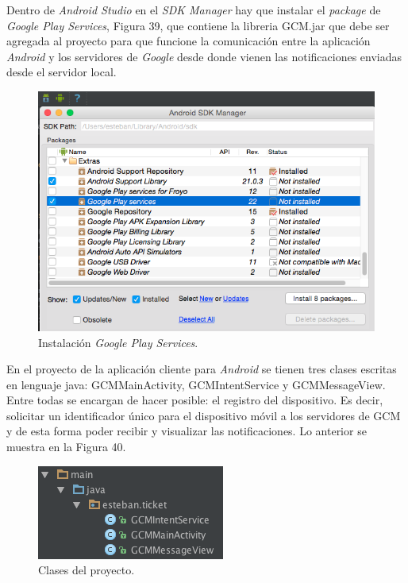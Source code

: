 Dentro de \textit{Android Studio} en el \textit{SDK Manager} hay que instalar el \textit{package} de \textit{Google Play Services}, Figura 39, que contiene la libreria GCM.jar que debe ser agregada al proyecto  para que funcione la comunicación entre la aplicación \textit{Android} y los servidores de \textit{Google} desde donde vienen las notificaciones enviadas desde el servidor local.\\

\begin{figure}[H]
\centering
\includegraphics[scale=0.50]{images/capitulo5/sdkManager.png}
\caption{Instalación \textit{Google Play Services}.}
\label{sdkManager}
\end{figure}

En el proyecto de la aplicación cliente para \textit{Android} se tienen tres clases escritas en lenguaje java: GCMMainActivity, GCMIntentService y GCMMessageView. Entre todas se encargan de hacer posible: el registro del dispositivo. Es decir, solicitar un identificador único para el dispositivo móvil a los servidores de GCM y de esta forma poder recibir y visualizar las notificaciones. Lo anterior se muestra en la Figura 40.\\

\begin{figure}[H]
\centering
\includegraphics[scale=0.70]{images/capitulo5/proyecto.png}
\caption{Clases del proyecto.}
\label{clasesProyecto}
\end{figure}

